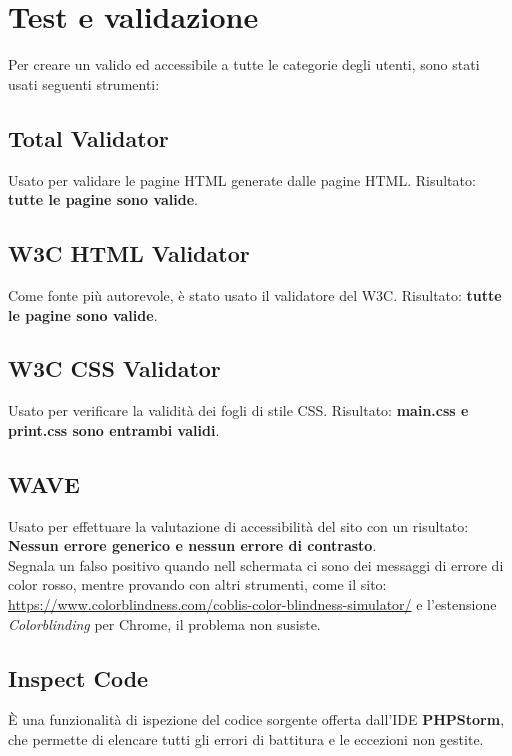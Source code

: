 \documentclass[1_relazione.tex]{subfiles}
\begin{document}
    \section{Test e validazione}\label{sec:test-e-validazione}
    Per creare un valido ed accessibile a tutte le categorie degli utenti, sono stati usati seguenti strumenti:

    \subsection{Total Validator}
    Usato per validare le pagine HTML generate dalle pagine HTML.\newline
    Risultato: \textbf{tutte le pagine sono valide}.
    \subsection{W3C HTML Validator}
    Come fonte pi\`{u} autorevole, \`{e} stato usato il validatore del W3C.\newline
    Risultato: \textbf{tutte le pagine sono valide}.
    \subsection{W3C CSS Validator}
    Usato per verificare la validit\`{a} dei fogli di stile CSS. \newline
    Risultato: \textbf{main.css e print.css sono entrambi validi}.
    \subsection{WAVE}
    Usato per effettuare la valutazione di accessibilit\`{a} del sito con un risultato: \textbf{Nessun errore generico e nessun errore di contrasto}.
    \\Segnala un falso positivo quando nell schermata ci sono dei messaggi di errore di color rosso, mentre provando con altri strumenti, come il sito:\\ \url{https://www.colorblindness.com/coblis-color-blindness-simulator/}
    e l'estensione \textit{Colorblinding} per Chrome, il problema non susiste.
    
    \subsection{Inspect Code}
    \`{E} una funzionalit\`{a} di ispezione del codice sorgente offerta dall'IDE \textbf{PHPStorm}, che permette di elencare tutti gli errori di battitura e le eccezioni non gestite.
\end{document}
